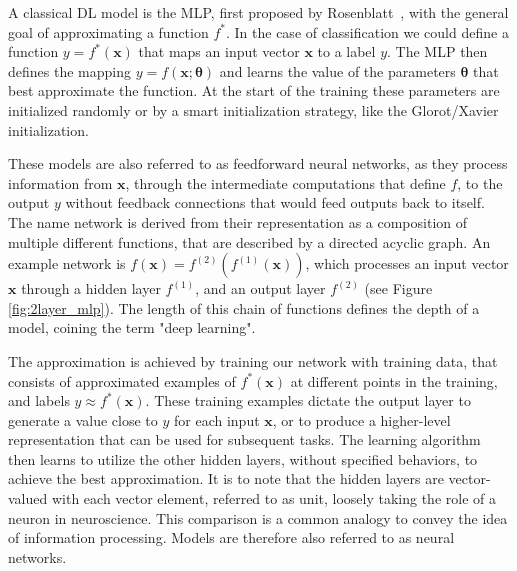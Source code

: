 A classical DL model is the \ac{MLP}, first proposed by Rosenblatt~\cite{rosenblatt1958perceptron}, with the general goal of approximating a function $f^*$. In the case of classification we could define a function $y = f^*(\mathbf{x})$ that maps an input vector $\mathbf{x}$ to a label $y$. The MLP then defines the mapping $y = f(\mathbf{x};\boldsymbol{\theta})$ and learns the value of the parameters $\boldsymbol{\theta}$ that best approximate the function. At the start of the training these parameters are initialized randomly or by a smart initialization strategy, like the Glorot/Xavier~\cite{glorot2010understanding} initialization. \bigskip

These models are also referred to as feedforward neural networks, as they process information from $\mathbf{x}$, through the intermediate computations that define $f$, to the output $y$ without feedback connections that would feed outputs back to itself. The name network is derived from their representation as a composition of multiple different functions, that are described by a directed acyclic graph. An example network is $f(\mathbf{x}) = f^{(2)}(f^{(1)}(\mathbf{x}))$, which processes an input vector $\mathbf{x}$ through a hidden layer $f^{(1)}$, and an output layer $f^{(2)}$ (see Figure \ref{fig:2layer_mlp}).  The length of this chain of functions defines the depth of a model, coining the term "deep learning". 

The approximation is achieved by training our network with training data, that consists of approximated examples of $f^*(\mathbf{x})$ at different points in the training, and labels $y\approx f^*(\mathbf{x})$. These training examples dictate the output layer to generate a value close to $y$ for each input $\mathbf{x}$, or to produce a higher-level representation that can be used for subsequent tasks. The learning algorithm then learns to utilize the other hidden layers, without specified behaviors, to achieve the best approximation. It is to note that the hidden layers are vector-valued with each vector element, referred to as unit, loosely taking the role of a neuron in neuroscience. This comparison is a common analogy to convey the idea of information processing. Models are therefore also referred to as neural networks. \bigskip


